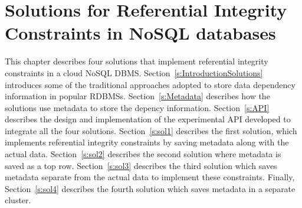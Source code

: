 \chapter{Solutions for Referential Integrity Constraints in NoSQL
databases}
\label{c:solutions}

This chapter describes  four  solutions  that implement referential
integrity constraints in a cloud \ac{NoSQL} \ac{DBMS}. 
Section~\ref{s:IntroductionSolutions} introduces some of the 
traditional approaches adopted to store  data dependency information in
popular \acp{RDBMS}.
Section~\ref{s:Metadata} describes how the solutions use metadata to store the
depency information.
Section~\ref{s:API} describes the design and implementation of the experimental
API developed to integrate all the four
solutions. 
Section~\ref{s:sol1} describes  the first solution, which implements
referential integrity constraints by saving metadata along with the actual data.
Section~\ref{s:sol2} describes the second  solution where metadata is
saved as a top row. Section~\ref{s:sol3} describes the third   
solution which saves metadata separate from the actual data to implement these
constraints.  Finally, Section~\ref{s:sol4}  describes the fourth solution which
saves metadata in a separate cluster.

